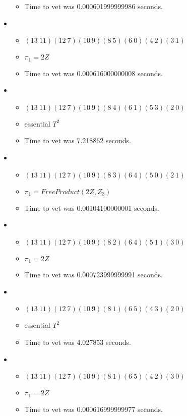 \documentclass{article}
\begin{document}
\begin{itemize}
\begin{itemize}
      \item Time to vet was 0.000601999999986 seconds.
\end{itemize}
\item \begin{itemize}
      \item $(13\ 11)(12\ 7)(10\ 9)(8\ 5)(6\ 0)(4\ 2)(3\ 1)$
      \item $\pi_1 =2 Z$
      \item Time to vet was 0.000616000000008 seconds.
\end{itemize}
\item \begin{itemize}
      \item $(13\ 11)(12\ 7)(10\ 9)(8\ 4)(6\ 1)(5\ 3)(2\ 0)$
      \item essential $T^2$
      \item Time to vet was 7.218862 seconds.
\end{itemize}
\item \begin{itemize}
      \item $(13\ 11)(12\ 7)(10\ 9)(8\ 3)(6\ 4)(5\ 0)(2\ 1)$
      \item $\pi_1 =FreeProduct( 2 Z, Z_3 )$
      \item Time to vet was 0.00104100000001 seconds.
\end{itemize}
\item \begin{itemize}
      \item $(13\ 11)(12\ 7)(10\ 9)(8\ 2)(6\ 4)(5\ 1)(3\ 0)$
      \item $\pi_1 =2 Z$
      \item Time to vet was 0.000723999999991 seconds.
\end{itemize}
\item \begin{itemize}
      \item $(13\ 11)(12\ 7)(10\ 9)(8\ 1)(6\ 5)(4\ 3)(2\ 0)$
      \item essential $T^2$
      \item Time to vet was 4.027853 seconds.
\end{itemize}
\item \begin{itemize}
      \item $(13\ 11)(12\ 7)(10\ 9)(8\ 1)(6\ 5)(4\ 2)(3\ 0)$
      \item $\pi_1 =2 Z$
      \item Time to vet was 0.000616999999977 seconds.

\end{itemize}
\end{itemize}
\end{document}
